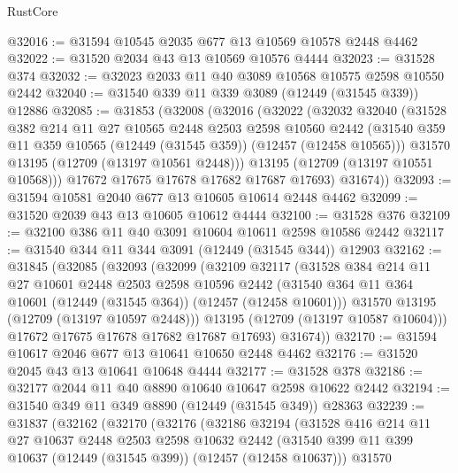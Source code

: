 \begin{lexlean}{RustCore}
\begin{coremodule}
@32016 := @31594 @10545 @2035 @677 @13 @10569 @10578 @2448 @4462
@32022 := @31520 @2034 @43 @13 @10569 @10576 @4444
@32023 := @31528 @374
@32032 := @32023 @2033 @11 @40 @3089 @10568 @10575 @2598 @10550 @2442
@32040 := @31540 @339 @11 @339 @3089 (@12449 (@31545 @339)) @12886
@32085 := @31853
    (@32008
      (@32016
        (@32022
          (@32032
            @32040
            (@31528
              @382
              @214
              @11
              @27
              @10565
              @2448
              @2503
              @2598
              @10560
              @2442
              (@31540 @359 @11 @359 @10565 (@12449 (@31545 @359)) (@12457 (@12458 @10565)))
              @31570
              @13195
              (@12709 (@13197 @10561 @2448)))
            @13195
            (@12709 (@13197 @10551 @10568)))
          @17672
          @17675
          @17678
          @17682
          @17687
          @17693)
        @31674))
@32093 := @31594 @10581 @2040 @677 @13 @10605 @10614 @2448 @4462
@32099 := @31520 @2039 @43 @13 @10605 @10612 @4444
@32100 := @31528 @376
@32109 := @32100 @386 @11 @40 @3091 @10604 @10611 @2598 @10586 @2442
@32117 := @31540 @344 @11 @344 @3091 (@12449 (@31545 @344)) @12903
@32162 := @31845
    (@32085
      (@32093
        (@32099
          (@32109
            @32117
            (@31528
              @384
              @214
              @11
              @27
              @10601
              @2448
              @2503
              @2598
              @10596
              @2442
              (@31540 @364 @11 @364 @10601 (@12449 (@31545 @364)) (@12457 (@12458 @10601)))
              @31570
              @13195
              (@12709 (@13197 @10597 @2448)))
            @13195
            (@12709 (@13197 @10587 @10604)))
          @17672
          @17675
          @17678
          @17682
          @17687
          @17693)
        @31674))
@32170 := @31594 @10617 @2046 @677 @13 @10641 @10650 @2448 @4462
@32176 := @31520 @2045 @43 @13 @10641 @10648 @4444
@32177 := @31528 @378
@32186 := @32177 @2044 @11 @40 @8890 @10640 @10647 @2598 @10622 @2442
@32194 := @31540 @349 @11 @349 @8890 (@12449 (@31545 @349)) @28363
@32239 := @31837
    (@32162
      (@32170
        (@32176
          (@32186
            @32194
            (@31528
              @416
              @214
              @11
              @27
              @10637
              @2448
              @2503
              @2598
              @10632
              @2442
              (@31540 @399 @11 @399 @10637 (@12449 (@31545 @399)) (@12457 (@12458 @10637)))
              @31570

\end{coremodule}
\end{lexlean}
